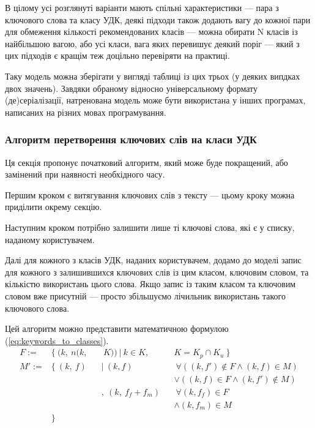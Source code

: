 \documentclass[14pt]{extarticle}
\begin{document}
  В цілому усі розглянуті варіанти мають спільні характеристики ---
  пара з ключового слова та класу УДК,
  деякі підходи також додають вагу до кожної пари для обмеження кількості
  рекомендованих класів --- можна обирати N класів із найбільшою вагою,
  або усі класи, вага яких перевишує деякий поріг ---
  який з цих підходів є кращім теж доцільно перевіряти на практиці.

  Таку модель можна зберігати у вигляді таблиці із цих трьох
  (у деяких випдках двох значень).
  Завдяки обраному відносно універсальному формату (де)серіалізації,
  натренована модель може бути використана у інших програмах,
  написаних на різних мовах програмування.

  \subsubsection{Алгоритм перетворення ключових слів на класи УДК}
  Ця секція пропонує початковий алгоритм, який може буде покращений,
  або замінений при наявності необхідного часу.

  Першим кроком є витягування ключових слів з тексту ---
  цьому кроку можна приділити окрему секцію.

  Наступним кроком потрібно залишити лише ті ключові слова, які є у списку,
  наданому користувачем.

  Далі для кожного з класів УДК, наданих користувачем,
  додамо до моделі запис для кожного з залишившихся ключових слів із цим класом,
  ключовим словом, та кількістю використань цього слова.
  Якщо запис із таким класом та ключовим словом вже присутній ---
  просто збільшуємо лічильник використань такого ключового слова.

  Цей алгоритм можно представити математичною формулою
    (\ref{eq:keywords_to_classes}).
  \begin{equation}
    \begin{alignedat}{3}
      F := &\{~ (k,~ n(k,&&~ K)) ~|~ k \in K,~ &&K = K_p \cap K_u ~\} \\
      M':= &\{~ (k,~ f)  &&|~ (k, f)          &&~\forall ((k, f') \notin F
           \land   (k, f) \in M) \\
           &             &&                    &&\lor   ((k, f) \in F
           \land   (k, f') \notin M) \\
           &             &&,~ (k,~ f_f + f_m) &&~\forall (k, f_f) \in F \\
           &             &&                    &&\land   (k, f_m) \in M \\
           &\}
    \end{alignedat}
    \label{eq:keywords_to_classes}
  \end{equation}
\end{document}

